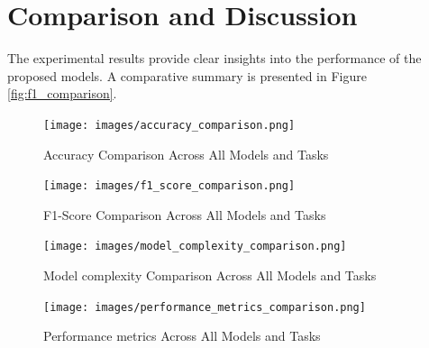 \documentclass[12pt]{report}
\begin{document}
\newpage

\section{Comparison and Discussion}
The experimental results provide clear insights into the performance of the proposed models. A comparative summary is presented in Figure \ref{fig:f1_comparison}.

\begin{figure}[H]
    \centering
    \texttt{[image: images/accuracy\_comparison.png]} %
    \caption{Accuracy Comparison Across All Models and Tasks}
    \label{fig:accuracy_comparison}
\end{figure}
\begin{figure}[H]
    \centering
    \texttt{[image: images/f1\_score\_comparison.png]} %
    \caption{F1-Score Comparison Across All Models and Tasks}
    \label{fig:f1_score_comparison}
\end{figure}
\begin{figure}[H]
    \centering
    \texttt{[image: images/model\_complexity\_comparison.png]} %
    \caption{Model complexity Comparison Across All Models and Tasks}
    \label{fig:model_complexity_comparison}
\end{figure}
\begin{figure}[H]
    \centering
    \texttt{[image: images/performance\_metrics\_comparison.png]} %
    \caption{Performance metrics Across All Models and Tasks}
    \label{fig:performance_metrics_comparison}
\end{figure}
\end{document}
